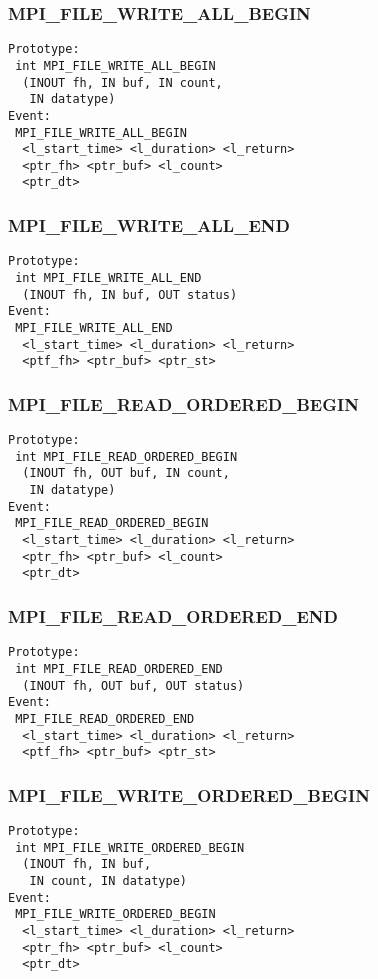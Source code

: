 \documentclass{article}
\begin{document}
\subsubsection{MPI\_FILE\_WRITE\_ALL\_BEGIN}
\label{sec:MPIFILEWRITEALLBEGIN}
\begin{verbatim}
Prototype:
 int MPI_FILE_WRITE_ALL_BEGIN
  (INOUT fh, IN buf, IN count, 
   IN datatype)
Event:
 MPI_FILE_WRITE_ALL_BEGIN 
  <l_start_time> <l_duration> <l_return>
  <ptr_fh> <ptr_buf> <l_count>
  <ptr_dt>
\end{verbatim}

\subsubsection{MPI\_FILE\_WRITE\_ALL\_END}
\label{sec:MPIFILEWRITEALLEND}
\begin{verbatim}
Prototype:
 int MPI_FILE_WRITE_ALL_END
  (INOUT fh, IN buf, OUT status)
Event:
 MPI_FILE_WRITE_ALL_END 
  <l_start_time> <l_duration> <l_return>
  <ptf_fh> <ptr_buf> <ptr_st>
\end{verbatim}

\subsubsection{MPI\_FILE\_READ\_ORDERED\_BEGIN}
\label{sec:MPIFILEREADORDEREDBEGIN}
\begin{verbatim}
Prototype:
 int MPI_FILE_READ_ORDERED_BEGIN
  (INOUT fh, OUT buf, IN count, 
   IN datatype)
Event:
 MPI_FILE_READ_ORDERED_BEGIN 
  <l_start_time> <l_duration> <l_return>
  <ptr_fh> <ptr_buf> <l_count>
  <ptr_dt>
\end{verbatim}

\subsubsection{MPI\_FILE\_READ\_ORDERED\_END}
\label{sec:MPIFILEREADORDEREDEND}
\begin{verbatim}
Prototype:
 int MPI_FILE_READ_ORDERED_END
  (INOUT fh, OUT buf, OUT status)
Event:
 MPI_FILE_READ_ORDERED_END 
  <l_start_time> <l_duration> <l_return>
  <ptf_fh> <ptr_buf> <ptr_st>
\end{verbatim}

\subsubsection{MPI\_FILE\_WRITE\_ORDERED\_BEGIN}
\label{sec:MPIFILEWRITEORDEREDBEGIN}
\begin{verbatim}
Prototype:
 int MPI_FILE_WRITE_ORDERED_BEGIN
  (INOUT fh, IN buf, 
   IN count, IN datatype)
Event:
 MPI_FILE_WRITE_ORDERED_BEGIN 
  <l_start_time> <l_duration> <l_return>
  <ptr_fh> <ptr_buf> <l_count>
  <ptr_dt>
\end{verbatim}
\end{document}
